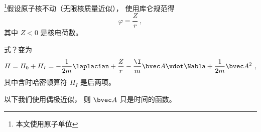 
\begin{issues}
\issueDraft
\end{issues}


\footnote{本文使用原子单位}假设原子核不动（无限核质量近似）， 使用库仑规范得
\begin{equation}
\varphi = \frac{Z}{r}~,
\end{equation}
其中 $Z < 0$ 是核电荷数。

式？变为
\begin{equation}
H = H_0 + H_I = -\frac{1}{2m} \laplacian +  \frac{Z}{r} - \frac{\I}{m} \bvec A \vdot \Nabla + \frac{1}{2m} \bvec A^2~,
\end{equation}
其中含时哈密顿算符 $H_I$ 是后两项。

以下我们使用偶极近似， 则 $\bvec A$ 只是时间的函数。
